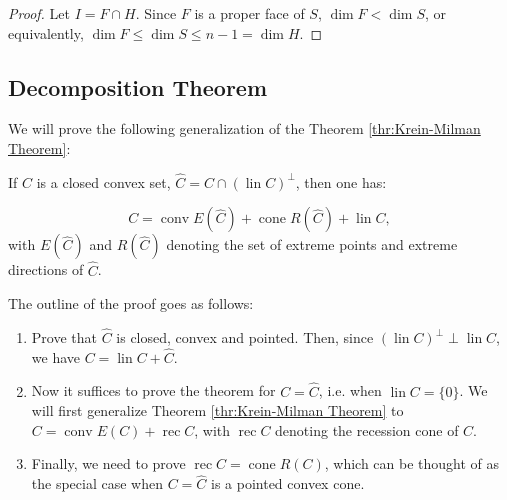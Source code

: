 \begin{proof}
  Let \( I = F \cap H \). Since \( F \) is a proper face of \( S \), \( \dim F <
  \dim S\), or equivalently, \( \dim F \le \dim S \le  n -1 = \dim H \).
\end{proof}



\subsection{Decomposition Theorem} %
\label{sub:Decomposition Theorem}

We will prove the following generalization of the Theorem \ref{thr:Krein-Milman
Theorem}:

\begin{theorem}
\label{thr:Decomposition Theorem}
  If \( C \) is a closed convex set, \( \hat{C} = C \cap (\operatorname{lin}
  C)^{\perp } \), then one has:

  \[
    C = \operatorname{conv} E(\hat{C}) + \operatorname{cone} R(\hat{C}) +
    \operatorname{lin} C
  ,\] with \( E(\hat{C}) \) and \( R(\hat{C}) \) denoting the set of extreme points and
  extreme directions of \( \hat{C} \).
\end{theorem}

The outline of the proof goes as follows:

\begin{enumerate}
  \item Prove that \( \hat{C} \) is closed, convex and pointed.
    Then, since \( (\operatorname{lin}
    C)^{\perp } \perp \operatorname{lin} C
    \), we have \( C = \operatorname{lin} C + \hat{C} \).
  \item Now it suffices to prove the theorem for \( C = \hat{C} \), i.e. when \(
    \operatorname{lin} C = \{0\}  \). We will first generalize Theorem
    \ref{thr:Krein-Milman Theorem} to \( C = \operatorname{conv} E(C) +
    \operatorname{rec} C \), with \( \operatorname{rec} C \) denoting the
    recession cone of \( C \).
  \item Finally, we need to prove \( \operatorname{rec} C = \operatorname{cone}
    R(C) \), which can be thought of as the special case when \( C = \hat{C} \)
    is a pointed convex cone.
\end{enumerate}

